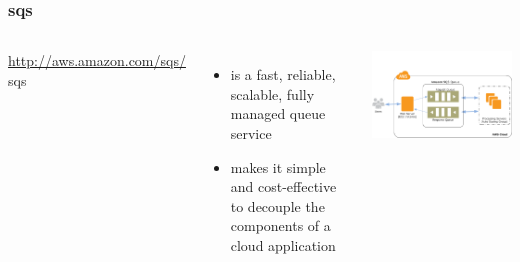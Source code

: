 \documentclass{beamer}
\begin{document}
\begin{frame}
\frametitle[\gls{sqs}]{\acrfull{sqs}}

\begin{columns}
\url{http://aws.amazon.com/sqs/}
\gls{sqs} 
\begin{itemize}
 \item is a fast, reliable, scalable, fully managed queue service
  \item makes it simple and cost-effective to decouple the components of a cloud application
\end{itemize}
\includegraphics[width=1.0 \textwidth]{sqs-as-workflow.png}
\end{columns}
\end{frame}
\end{document}
